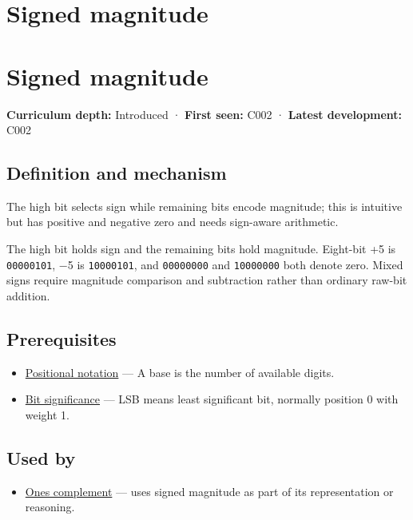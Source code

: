 \hypertarget{appendix-ce20506c8532}{}
\section*{Signed magnitude}
\section{Signed magnitude}\label{signed-magnitude}

\textbf{Curriculum depth:} Introduced · \textbf{First seen:} C002 · \textbf{Latest development:} C002

\subsection{Definition and mechanism}\label{definition-and-mechanism}

The high bit selects sign while remaining bits encode magnitude; this is intuitive but has positive and negative zero and needs sign-aware arithmetic.

The high bit holds sign and the remaining bits hold magnitude. Eight-bit +5 is \texttt{00000101}, −5 is \texttt{10000101}, and \texttt{00000000} and \texttt{10000000} both denote zero. Mixed signs require magnitude comparison and subtraction rather than ordinary raw-bit addition.

\subsection{Prerequisites}\label{prerequisites}

\begin{itemize}
\tightlist
\item
  \hyperref[appendix-83c3f28f7bda]{Positional notation} --- A base is the number of available digits.
\item
  \hyperref[appendix-280445746493]{Bit significance} --- LSB means least significant bit, normally position 0 with weight 1.
\end{itemize}

\subsection{Used by}\label{used-by}

\begin{itemize}
\tightlist
\item
  \hyperref[appendix-03c678cd40b3]{One\textquotesingle s complement} --- uses signed magnitude as part of its representation or reasoning.
\end{itemize}

